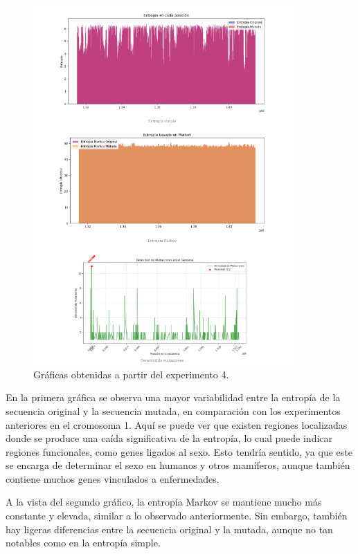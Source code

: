 \documentclass[11pt,spanish,listoffigures,listoftables]{tfgetsinf}
\begin{document}
\begin{figure}[H]
      \centering
      \includegraphics[width=0.9\textwidth]{graf_exp3.png}
      \caption{Gráficas obtenidas a partir del experimento 4.}
      \label{fig:etiqueta_opcional31}
\end{figure}

En la primera gráfica se observa una mayor variabilidad entre la entropía de la secuencia original y la secuencia mutada, en comparación con los experimentos anteriores en el cromosoma 1. Aquí se puede ver que existen regiones localizadas donde se produce una caída significativa de la entropía, lo cual puede indicar regiones funcionales, como genes ligados al sexo. Esto tendría sentido, ya que este se encarga de determinar el sexo en humanos y otros mamíferos, aunque también contiene muchos genes vinculados a enfermedades.

A la vista del segundo gráfico, la entropía Markov se mantiene mucho más constante y elevada, similar a lo observado anteriormente. Sin embargo, también hay ligeras diferencias entre la secuencia original y la mutada, aunque no tan notables como en la entropía simple.
\end{document}
